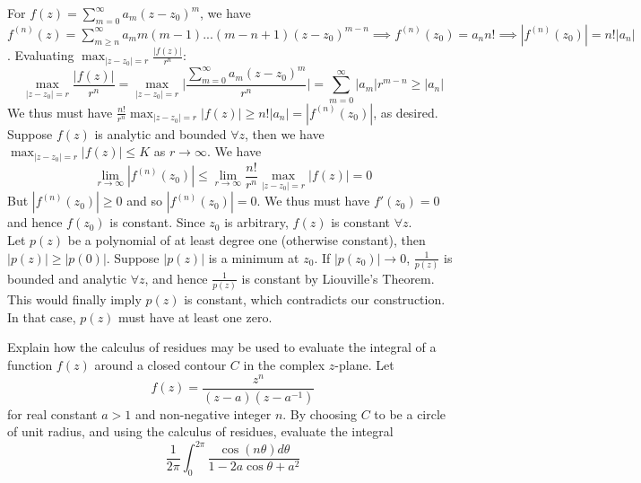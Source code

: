 \documentclass[a4paper]{article}
\begin{document}
\begin{ans}
For $f(z)=\sum_{m=0}^\infty a_m(z-z_0)^m$, we have $f^{(n)}(z)=\sum_{m\geq n}^\infty a_mm(m-1)...(m-n+1)(z-z_0)^{m-n}\implies f^{(n)}(z_0)=a_nn!\implies |f^{(n)}(z_0)|=n!|a_n|$. Evaluating $\max_{|z-z_0|=r}\frac{|f(z)|}{r^n}$:
$$\max_{|z-z_0|=r}\frac{|f(z)|}{r^n}=\max_{|z-z_0|=r}\bigg|\frac{\sum_{m=0}^\infty a_m(z-z_0)^m}{r^n}\bigg|=\sum_{m=0}^\infty |a_m|r^{m-n}\geq|a_n|$$
We thus must have $\frac{n!}{r^n}\max_{|z-z_0|=r}|f(z)|\geq n!|a_n|=|f^{(n)}(z_0)|$, as desired.\\[5pt]
Suppose $f(z)$ is analytic and bounded $\forall z$, then we have $\max_{|z-z_0|=r}|f(z)|\leq K$ as $r\rightarrow\infty$. We have
$$\lim_{r\rightarrow\infty}|f^{(n)}(z_0)|\leq\lim_{r\rightarrow\infty}\frac{n!}{r^n}\max_{|z-z_0|=r}|f(z)|=0$$
But $|f^{(n)}(z_0)|\geq0$ and so $|f^{(n)}(z_0)|=0$. We thus must have $f'(z_0)=0$ and hence $f(z_0)$ is constant. Since $z_0$ is arbitrary, $f(z)$ is constant $\forall z$.\\[5pt]
Let $p(z)$ be a polynomial of at least degree one (otherwise constant), then $|p(z)|\geq|p(0)|$. Suppose $|p(z)|$ is a minimum at $z_0$. If $|p(z_0)|\rightarrow 0$, $\frac{1}{p(z)}$ is bounded and analytic $\forall z$, and hence $\frac{1}{p(z)}$ is constant by Liouville's Theorem. This would finally imply $p(z)$ is constant, which contradicts our construction. In that case, $p(z)$ must have at least one zero. 
\end{ans}
\newpage
\begin{qns}
Explain how the calculus of residues may be used to evaluate the integral of a function $f(z)$ around a closed contour $C$ in the complex $z$-plane. Let
$$f(z)=\frac{z^n}{(z-a)(z-a^{-1})}$$
for real constant $a>1$ and non-negative integer $n$. By choosing $C$ to be a circle  of unit radius, and using the calculus of residues, evaluate the integral
$$\frac{1}{2\pi}\int_0^{2\pi}\frac{\cos(n\theta)d\theta}{1-2a\cos\theta+a^2}$$
\end{qns}
\end{document}
